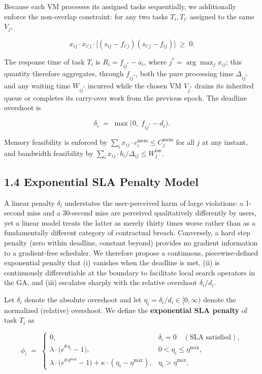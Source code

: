 \documentclass[11pt,a4paper]{article}
\begin{document}
Because each VM processes its assigned tasks sequentially, we additionally enforce the non-overlap constraint: for any two tasks $T_i, T_{i'}$ assigned to the same $V_j$,

$$
x_{ij} \cdot x_{i'j} \cdot \big[ (s_{ij} - f_{i'j})(s_{i'j} - f_{ij}) \big] \;\geq\; 0.
$$

The response time of task $T_i$ is $R_i = f_{ij^{*}} - a_i$, where $j^{*} = \arg\max_j x_{ij}$; this quantity therefore aggregates, through $f_{ij^{*}}$, both the pure processing time $\Delta_{ij^{*}}$ and any waiting time $W_{ij^{*}}$ incurred while the chosen VM $V_{j^{*}}$ drains its inherited queue or completes its carry-over work from the previous epoch. The deadline overshoot is

$$
\delta_i \;=\; \max\big(0,\; f_{ij^{*}} - d_i\big).
$$

Memory feasibility is enforced by $\sum_{i} x_{ij} \cdot c^{\text{mem}}_i \leq C^{\text{mem}}_j$ for all $j$ at any instant, and bandwidth feasibility by $\sum_{i} x_{ij} \cdot b_i / \Delta_{ij} \leq W^{\text{bw}}_j$.

\subsection*{1.4 Exponential SLA Penalty Model}

A linear penalty $\delta_i$ understates the user-perceived harm of large violations: a 1-second miss and a 30-second miss are perceived qualitatively differently by users, yet a linear model treats the latter as merely thirty times worse rather than as a fundamentally different category of contractual breach. Conversely, a hard step penalty (zero within deadline, constant beyond) provides no gradient information to a gradient-free scheduler. We therefore propose a continuous, piecewise-defined exponential penalty that (i) vanishes when the deadline is met, (ii) is continuously differentiable at the boundary to facilitate local search operators in the GA, and (iii) escalates sharply with the relative overshoot $\delta_i / d_i$.

Let $\delta_i$ denote the absolute overshoot and let $\eta_i = \delta_i / d_i \in [0, \infty)$ denote the normalized (relative) overshoot. We define the \textbf{exponential SLA penalty} of task $T_i$ as

$$
\boxed{\;\phi_i \;=\; \begin{cases}
0, & \delta_i = 0 \quad (\text{SLA satisfied}),\\[4pt]
\lambda \cdot \Big( e^{\theta \, \eta_i} - 1 \Big), & 0 < \eta_i \leq \eta^{\max}, \\[4pt]
\lambda \cdot \Big( e^{\theta \, \eta^{\max}} - 1 \Big) + \kappa \cdot (\eta_i - \eta^{\max}), & \eta_i > \eta^{\max},
\end{cases}\;}
$$
\end{document}

